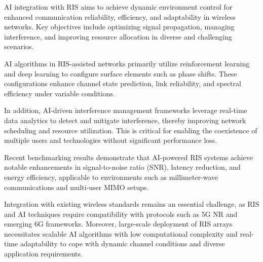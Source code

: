 \documentclass[sigconf]{acmart}
\begin{document}
AI integration with RIS aims to achieve dynamic environment control for enhanced communication reliability, efficiency, and adaptability in wireless networks. Key objectives include optimizing signal propagation, managing interference, and improving resource allocation in diverse and challenging scenarios.

AI algorithms in RIS-assisted networks primarily utilize reinforcement learning and deep learning to configure surface elements such as phase shifts. These configurations enhance channel state prediction, link reliability, and spectral efficiency under variable conditions.

In addition, AI-driven interference management frameworks leverage real-time data analytics to detect and mitigate interference, thereby improving network scheduling and resource utilization. This is critical for enabling the coexistence of multiple users and technologies without significant performance loss.

Recent benchmarking results demonstrate that AI-powered RIS systems achieve notable enhancements in signal-to-noise ratio (SNR), latency reduction, and energy efficiency, applicable to environments such as millimeter-wave communications and multi-user MIMO setups.

Integration with existing wireless standards remains an essential challenge, as RIS and AI techniques require compatibility with protocols such as 5G NR and emerging 6G frameworks. Moreover, large-scale deployment of RIS arrays necessitates scalable AI algorithms with low computational complexity and real-time adaptability to cope with dynamic channel conditions and diverse application requirements.
\end{document}
